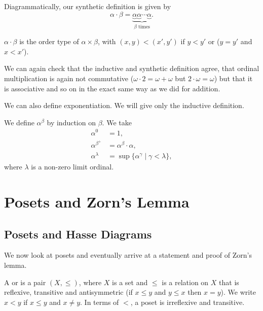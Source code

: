 \documentclass[a4paper, 10pt, twocolumn]{amsart}
\begin{document}
Diagrammatically, our synthetic definition is given by
$$
\alpha \cdot \beta = \underbrace{
  \underbrace{\alpha}
  \underbrace{\alpha}
  \cdots
  \underbrace{\alpha}
}_{\beta\text{ times}}.
$$

\begin{definition}
  $\alpha \cdot \beta$ is the order type of $\alpha \times \beta$, with $(x, y) < (x', y')$ if $y < y'$ or ($y = y'$ and $x < x'$).
\end{definition}

We can again check that the inductive and synthetic definition agree, that ordinal multiplication is again not commutative ($\omega \cdot 2 = \omega + \omega$ but $2 \cdot \omega = \omega$) but that it is associative and so on in the exact same way as we did for addition.

We can also define exponentiation. We will give only the inductive definition.

\begin{definition}
  We define $\alpha^\beta$ by induction on $\beta$. We take
  \begin{align*}
    \alpha^0 &= 1, \\
    \alpha^{\beta^+} &= \alpha^\beta \cdot \alpha, \\
    \alpha^\lambda &= \sup \{\alpha^\gamma \mid \gamma < \lambda\},
  \end{align*}
  where $\lambda$ is a non-zero limit ordinal.
\end{definition}


\section{Posets and Zorn's Lemma}

\subsection{Posets and Hasse Diagrams}

We now look at posets and eventually arrive at a statement and proof of Zorn's lemma.

\begin{definition}[Poset]
  A  or  is a pair $(X, \leq)$, where $X$ is a set and $\leq$ is a relation on $X$ that is reflexive, transitive and antisymmetric (if $x \leq y$ and $y \leq x$ then $x = y$). We write $x < y$ if $x \leq y$ and $x \neq y$. In terms of $<$, a poset is irreflexive and transitive.
\end{definition}
\end{document}
